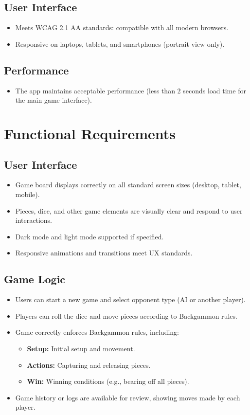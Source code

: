 \documentclass{article}
\begin{document}
\subsection{User Interface}
\begin{itemize}
    \item Meets WCAG 2.1 AA standards: compatible with all modern browsers.
    \item Responsive on laptops, tablets, and smartphones (portrait view only).
\end{itemize}

\subsection{Performance}
\begin{itemize}
    \item The app maintains acceptable performance (less than 2 seconds load time for the main game interface).
\end{itemize}

\section{Functional Requirements}

\subsection{User Interface}
\begin{itemize}
    \item Game board displays correctly on all standard screen sizes (desktop, tablet, mobile).
    \item Pieces, dice, and other game elements are visually clear and respond to user interactions.
    \item Dark mode and light mode supported if specified.
    \item Responsive animations and transitions meet UX standards.
\end{itemize}

\subsection{Game Logic}
\begin{itemize}
    \item Users can start a new game and select opponent type (AI or another player).
    \item Players can roll the dice and move pieces according to Backgammon rules.
    \item Game correctly enforces Backgammon rules, including:
    \begin{itemize}
        \item \textbf{Setup:} Initial setup and movement.
        \item \textbf{Actions:} Capturing and releasing pieces.
        \item \textbf{Win:} Winning conditions (e.g., bearing off all pieces).
    \end{itemize}
    \item Game history or logs are available for review, showing moves made by each player.
\end{itemize}
\end{document}
